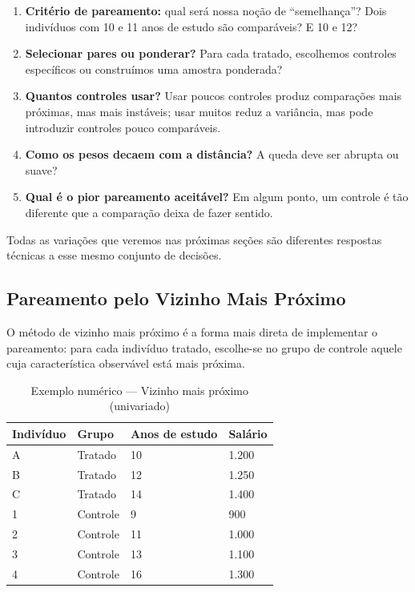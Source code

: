 \documentclass[12pt,a4paper]{article}
\begin{document}
\begin{enumerate}
  \item \textbf{Critério de pareamento:} qual será nossa noção de ``semelhança''? Dois indivíduos com 10 e 11 anos de estudo são comparáveis? E 10 e 12?
  \item \textbf{Selecionar pares ou ponderar?} Para cada tratado, escolhemos controles específicos ou construímos uma amostra ponderada?
  \item \textbf{Quantos controles usar?} Usar poucos controles produz comparações mais próximas, mas mais instáveis; usar muitos reduz a variância, mas pode introduzir controles pouco comparáveis.
  \item \textbf{Como os pesos decaem com a distância?} A queda deve ser abrupta ou suave?
  \item \textbf{Qual é o pior pareamento aceitável?} Em algum ponto, um controle é tão diferente que a comparação deixa de fazer sentido.
\end{enumerate}

Todas as variações que veremos nas próximas seções são diferentes respostas técnicas a esse mesmo conjunto de decisões.

\subsection{Pareamento pelo Vizinho Mais Próximo}

O método de vizinho mais próximo é a forma mais direta de implementar o pareamento: para cada indivíduo tratado, escolhe-se no grupo de controle aquele cuja característica observável está mais próxima.

\begin{table}[H]
\centering
\caption{Exemplo numérico --- Vizinho mais próximo (univariado)}\label{tab:nn1}
\begin{tabular}{llll}
\toprule
Indivíduo & Grupo & Anos de estudo & Salário \\
\midrule
A & Tratado  & 10 & 1.200 \\
B & Tratado  & 12 & 1.250 \\
C & Tratado  & 14 & 1.400 \\
1 & Controle &  9 & 900   \\
2 & Controle & 11 & 1.000 \\
3 & Controle & 13 & 1.100 \\
4 & Controle & 16 & 1.300 \\
\bottomrule
\end{tabular}
\end{table}
\end{document}
